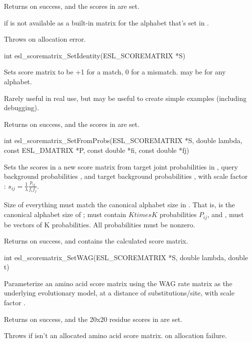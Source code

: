 \begin{sreapi}
Returns  on success, and the scores in  are set.

 if  is not available as a built-in matrix
for the alphabet that's set in .

Throws  on allocation error.


\hypertarget{func:esl_scorematrix_SetIdentity()}
{\item[int esl\_scorematrix\_SetIdentity(ESL\_SCOREMATRIX *S)]}

Sets score matrix  to be +1 for a match, 
0 for a mismatch.  may be for any alphabet.

Rarely useful in real use, but may be useful to create
simple examples (including debugging).

Returns  on success, and the scores in  are set.


\hypertarget{func:esl_scorematrix_SetFromProbs()}
{\item[int esl\_scorematrix\_SetFromProbs(ESL\_SCOREMATRIX *S, double lambda, const ESL\_DMATRIX *P, const double *fi, const double *fj)]}

Sets the scores in a new score matrix  from target joint
probabilities in , query background probabilities , and 
target background probabilities , with scale factor :
$s_{ij} = \frac{1}{\lambda} \frac{p_{ij}}{f_i f_j}$.

Size of everything must match the canonical alphabet
size in . That is,  is the canonical
alphabet size of ;  must contain $K times K$
probabilities $P_{ij}$, and , must be vectors of
K probabilities. All probabilities must be nonzero.

Returns  on success, and  contains the calculated score matrix.


\hypertarget{func:esl_scorematrix_SetWAG()}
{\item[int esl\_scorematrix\_SetWAG(ESL\_SCOREMATRIX *S, double lambda, double t)]}

Parameterize an amino acid score matrix  using the WAG
rate matrix \citep{WhelanGoldman01} as the underlying
evolutionary model, at a distance of 
substitutions/site, with scale factor .

Returns  on success, and the 20x20 residue scores in  are set.

Throws  if  isn't an allocated amino acid score matrix.
 on allocation failure.



\end{sreapi}
